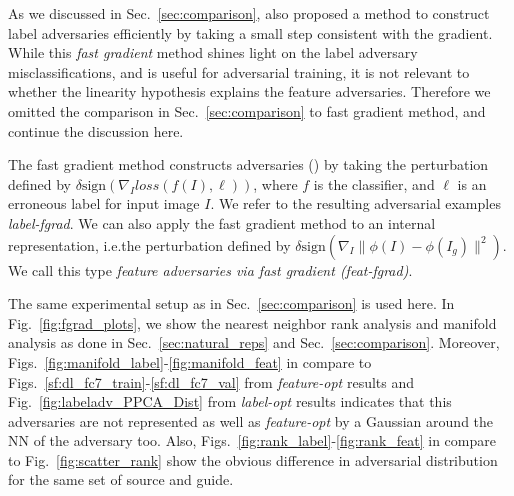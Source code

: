 \documentclass{article} %
\begin{document}
As we discussed in Sec.~\ref{sec:comparison}, \cite{GoodfellowEtalICLR2015}
also proposed a method to construct label adversaries efficiently by taking
a small step consistent with the gradient.  While this {\em fast gradient}
method shines light on the label adversary misclassifications, and is useful
for adversarial training, it is not relevant to whether the linearity
hypothesis explains the feature adversaries.  Therefore we omitted the
comparison in Sec.~\ref{sec:comparison} to fast gradient method, and continue
the discussion here.

The fast gradient method constructs adversaries (\cite{GoodfellowEtalICLR2015})
by taking the perturbation defined by $\delta \text{sign}(\nabla_I loss(f(I),
\ell ))$, where $f$ is the classifier, and $\ell$ is an erroneous label for
input image $I$.  We refer to the resulting adversarial examples {\em
label-fgrad}. We can also apply the fast gradient method to an internal
representation, i.e.\taking the perturbation defined by $\delta
\text{sign}(\nabla_I \| \phi(I) - \phi(I_g) \|^2)$. We call this
type {\em feature adversaries via fast gradient (feat-fgrad)}.

The same experimental setup as in Sec.~\ref{sec:comparison} is used here.  In
Fig.~\ref{fig:fgrad_plots}, we show the nearest neighbor rank analysis and
manifold analysis as done in Sec.~\ref{sec:natural_reps} and
Sec.~\ref{sec:comparison}.  Moreover,
Figs.~\ref{fig:manifold_label}-\ref{fig:manifold_feat} in compare to
Figs.~\ref{sf:dl_fc7_train}-\ref{sf:dl_fc7_val} from {\em feature-opt} results
and Fig.~\ref{fig:labeladv_PPCA_Dist} from {\em label-opt} results indicates
that this adversaries are not represented as well as {\em feature-opt} by
a Gaussian around the NN of the adversary too. Also,
Figs.~\ref{fig:rank_label}-\ref{fig:rank_feat} in compare to
Fig.~\ref{fig:scatter_rank} show the obvious difference in adversarial
distribution for the same set of source and guide.
\end{document}
